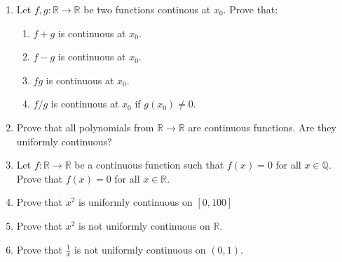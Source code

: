 \documentclass[12pt]{article}
\begin{document}
\begin{enumerate}
    \item Let $f,g:\mathbb{R}\to\mathbb{R}$ be two functions continous at $x_0$. Prove that:
    \begin{enumerate}
        \item \( f+g \) is continuous at \( x_0 \).
        \item \( f-g \) is continuous at \( x_0 \).
        \item \( fg \) is continuous at \( x_0 \).
        \item \( f/g \) is continuous at \( x_0 \) if \( g(x_0) \neq 0 \).
    \end{enumerate}
    \item Prove that all polynomials from \( \mathbb{R} \to \mathbb{R} \) are continuous functions. Are they uniformly continuous?
    \item Let \( f:\mathbb{R}\to\mathbb{R} \) be a continuous function such that \( f(x) = 0 \) for all \( x \in \mathbb{Q} \). Prove that \( f(x) = 0 \) for all \( x \in \mathbb{R} \).
    \item Prove that $x^2$ is uniformly continuous on $[0,100]$
    \item Prove that $x^2$ is not uniformly continuous on $\mathbb{R}$.
    \item Prove that $\frac{1}{x}$ is not uniformly continuous on $(0, 1)$.
\end{enumerate}
\end{document}
